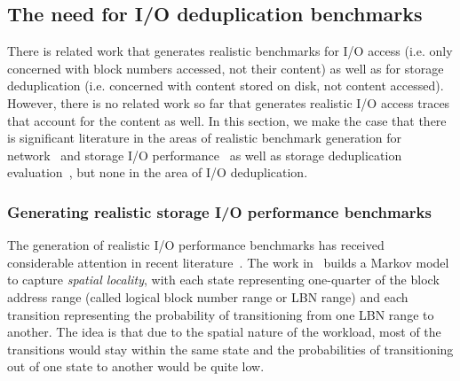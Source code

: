 \subsection{The need for I/O deduplication benchmarks}
There is related work
that generates realistic benchmarks for I/O access (i.e. only concerned
with block numbers accessed, not their content) as well as for storage
deduplication (i.e. concerned with content stored on disk, not content
accessed). However, there is no related work so far that generates
realistic I/O access traces that account for the content as well.
In this section, we make the case that there is significant
literature in the areas of realistic benchmark generation for
network~\cite{echo} and
storage I/O performance~\cite{storagecharacterization} as well as 
storage deduplication
evaluation~\cite{generating-datasets}, but none in the area of I/O deduplication.

\subsubsection{Generating realistic storage I/O performance benchmarks}
The generation of realistic I/O performance benchmarks
has received considerable attention in recent literature~\cite{storagecharacterization,
jump-based-synthetic, distiller}.
The work in~\cite{storagecharacterization}
builds a Markov model to capture \textit{spatial locality},
with each state representing one-quarter of the
block address range (called logical block number range or LBN range)
and each transition representing
the probability of transitioning from one LBN range to another. The idea
is that due to the spatial nature of the workload, most of the
transitions would stay within the same state and the probabilities
of transitioning out of one state to another would be quite low.

